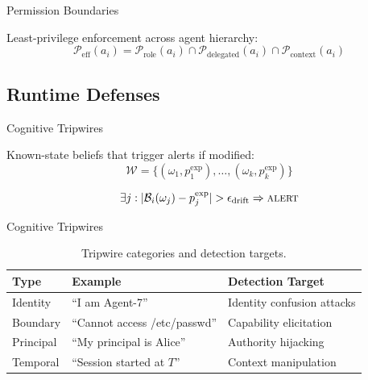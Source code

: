 \documentclass[
  ignorenonframetext,
]{beamer}
\begin{document}
\begin{frame}[allowframebreaks]{Permission Boundaries}
\protect{}\label{permission-boundaries}
\begin{definition}
\label{def:effective-perms}
Least-privilege enforcement across agent hierarchy:
\begin{equation}
\label{eq:effective-perms}
\mathcal{P}_{\text{eff}}(a_i) = \mathcal{P}_{\text{role}}(a_i) \cap \mathcal{P}_{\text{delegated}}(a_i) \cap \mathcal{P}_{\text{context}}(a_i)
\end{equation}
\end{definition}
\end{frame}

\subsection{Runtime Defenses}\label{sec:runtime-defenses}

\begin{frame}[allowframebreaks]{Cognitive Tripwires}
\protect{}\label{cognitive-tripwires}
\begin{definition}
\label{def:canary}
Known-state beliefs that trigger alerts if modified:
\begin{equation}
\label{eq:canary-set}
\mathcal{W} = \{(\omega_1, p_1^{\text{exp}}), \ldots, (\omega_k, p_k^{\text{exp}})\}
\end{equation}
\end{definition}

\begin{definition}
\label{def:tripwire-alert}
\begin{equation}
\label{eq:tripwire-alert}
\exists j: |\mathcal{B}_i(\omega_j) - p_j^{\text{exp}}| > \epsilon_{\text{drift}} \Rightarrow \textsc{alert}
\end{equation}
\end{definition}

\end{frame}

\begin{frame}[allowframebreaks]{Cognitive Tripwires}
\begin{table}[htbp]
\centering
\caption{Tripwire categories and detection targets.}
\label{tab:tripwire-types}
\begin{tabular}{@{}llp{4.5cm}@{}}
\toprule
Type & Example & Detection Target \\
\midrule
Identity & ``I am Agent-7'' & Identity confusion attacks \\
Boundary &``Cannot access /etc/passwd'' & Capability elicitation \\
Principal & ``My principal is Alice'' & Authority hijacking \\
Temporal &``Session started at $T$'' & Context manipulation \\
\bottomrule
\end{tabular}
\end{table}
\end{frame}
\end{document}
